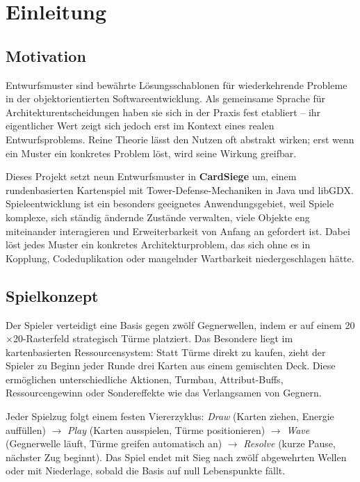 \section{Einleitung}

\subsection{Motivation}

Entwurfsmuster sind bewährte Lösungsschablonen für wiederkehrende Probleme in der
objektorientierten Softwareentwicklung. Als gemeinsame Sprache für Architekturentscheidungen
haben sie sich in der Praxis fest etabliert -- ihr eigentlicher Wert zeigt sich
jedoch erst im Kontext eines realen Entwurfsproblems. Reine Theorie lässt den
Nutzen oft abstrakt wirken; erst wenn ein Muster ein konkretes Problem löst,
wird seine Wirkung greifbar.

Dieses Projekt setzt neun Entwurfsmuster in \textbf{CardSiege} um, einem
rundenbasierten Kartenspiel mit Tower-Defense-Mechaniken in Java und libGDX.
Spieleentwicklung ist ein besonders geeignetes Anwendungsgebiet, weil Spiele
komplexe, sich ständig ändernde Zustände verwalten, viele Objekte eng
miteinander interagieren und Erweiterbarkeit von Anfang an gefordert ist.
Dabei löst jedes Muster ein konkretes Architekturproblem, das sich ohne es
in Kopplung, Codeduplikation oder mangelnder Wartbarkeit niedergeschlagen hätte.

\subsection{Spielkonzept}

Der Spieler verteidigt eine Basis gegen zwölf Gegnerwellen, indem er auf einem
20$\times$20-Rasterfeld strategisch Türme platziert. Das Besondere liegt im
kartenbasierten Ressourcensystem: Statt Türme direkt zu kaufen, zieht der Spieler
zu Beginn jeder Runde drei Karten aus einem gemischten Deck. Diese ermöglichen
unterschiedliche Aktionen, Turmbau, Attribut-Buffs, Ressourcengewinn oder
Sondereffekte wie das Verlangsamen von Gegnern.

Jeder Spielzug folgt einem festen Viererzyklus: \textit{Draw} (Karten ziehen,
Energie auffüllen) $\rightarrow$ \textit{Play} (Karten ausspielen, Türme
positionieren) $\rightarrow$ \textit{Wave} (Gegnerwelle läuft, Türme greifen
automatisch an) $\rightarrow$ \textit{Resolve} (kurze Pause, nächster Zug
beginnt). Das Spiel endet mit Sieg nach zwölf abgewehrten Wellen oder mit
Niederlage, sobald die Basis auf null Lebenspunkte fällt.

